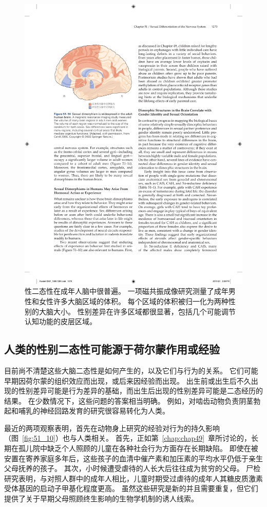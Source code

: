 \begin{figure}[htbp]
	\centering
	\includegraphics[width=0.63\linewidth]{chap51/fig_51_14}
	\caption{性二态性在成年人脑中很普遍。
		一项磁共振成像研究测量了成年男性和女性许多大脑区域的体积。
		每个区域的体积被归一化为两种性别的大脑大小。
		性别差异在许多区域都很显著，包括几个可能调节认知功能的皮层区域\cite{cahill2006sex}。 }
	\label{fig:51_14}
\end{figure}



\subsection{人类的性别二态性可能源于荷尔蒙作用或经验}

目前尚不清楚这些大脑二态性是如何产生的，以及它们与行为的关系。
它们可能早期因荷尔蒙的组织效应而出现，或后来因经验而出现。
出生前或出生后不久出现的性别差异可能是行为差异的基础，而出生后出现的性别差异可能是二态经历的结果。
在少数情况下，这些问题的答案相当明确。
例如，对啮齿动物负责阴茎勃起和哺乳的神经回路发育的研究很容易转化为人类。


最近的两项观察表明，首先在动物身上研究的经验对行为的持久影响（图~\ref{fig:51_10}）也与人类相关。
首先，正如第~\ref{chap:chap49}~章所讨论的，长期在孤儿院中缺乏个人照顾的儿童在各种社会行为方面存在长期缺陷。
即使在被安置在寄养家庭多年后，这些孩子的血清中催产素和加压素的平均水平仍低于亲生父母抚养的孩子。
其次，小时候遭受虐待的人长大后往往成为贫穷的父母。
尸检研究表明，与对照人群中的成年人相比，儿童时期受过虐待的成年人其糖皮质激素受体基因的启动子甲基化程度更高。
虽然这些研究是新的并且需要重复，但它们提供了关于早期父母照顾终生影响的生物学机制的诱人线索。



